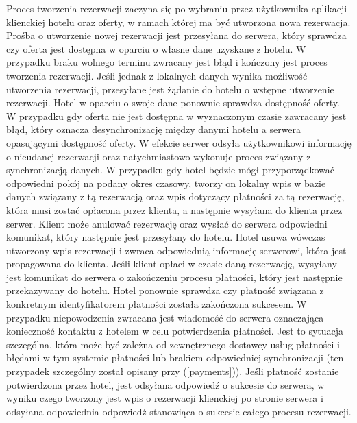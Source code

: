 \documentclass{article}
\begin{document}
\indent \indent Proces tworzenia rezerwacji zaczyna się po wybraniu przez użytkownika aplikacji klienckiej hotelu oraz oferty, w ramach której ma być utworzona nowa rezerwacja. Prośba o utworzenie nowej rezerwacji jest przesyłana do serwera, który sprawdza czy oferta jest dostępna w oparciu o własne dane uzyskane z hotelu. W przypadku braku wolnego terminu zwracany jest błąd i kończony jest proces tworzenia rezerwacji. 
\newline
\indent Jeśli jednak z lokalnych danych wynika możliwość utworzenia rezerwacji, przesyłane jest żądanie do hotelu o wstępne utworzenie rezerwacji. Hotel w oparciu o swoje dane ponownie sprawdza dostępność oferty. W przypadku gdy oferta nie jest dostępna w wyznaczonym czasie zawracany jest błąd, który oznacza desynchronizację między danymi hotelu a serwera opasującymi dostępność oferty. W efekcie serwer odsyła użytkownikowi informację o nieudanej rezerwacji oraz natychmiastowo wykonuje proces związany z synchronizacją danych. 
\newline
\indent W przypadku gdy hotel będzie mógł przyporządkować odpowiedni pokój na podany okres czasowy, tworzy on lokalny wpis w bazie danych związany z tą rezerwacją oraz wpis dotyczący płatności za tą rezerwację, która musi zostać opłacona przez klienta, a następnie wysyłana do klienta przez serwer.
\newline
\indent Klient może anulować rezerwację oraz wysłać do serwera odpowiedni komunikat, który następnie jest przesyłany do hotelu. Hotel usuwa wówczas utworzony wpis rezerwacji i zwraca odpowiednią informację serwerowi, która jest propagowana do klienta.
\newline
\indent Jeśli klient opłaci w czasie daną rezerwację, wysyłany jest komunikat do serwera o zakończeniu procesu płatności, który jest następnie przekazywany do hotelu. Hotel ponownie sprawdza czy płatność związana z konkretnym identyfikatorem płatności została zakończona sukcesem.
\newline
\indent W przypadku niepowodzenia zwracana jest wiadomość do serwera oznaczająca konieczność kontaktu z hotelem w celu potwierdzenia płatności. Jest to sytuacja szczególna, która może być zależna od zewnętrznego dostawcy usług płatności i błędami w tym systemie płatności lub brakiem odpowiedniej synchronizacji (ten przypadek szczególny został opisany przy (\ref{payments})).
\newline
\indent Jeśli płatność zostanie potwierdzona przez hotel, jest odsyłana odpowiedź o sukcesie do serwera, w wyniku czego tworzony jest wpis o rezerwacji klienckiej po stronie serwera i odsyłana odpowiednia odpowiedź stanowiąca o sukcesie całego procesu rezerwacji.
\end{document}
